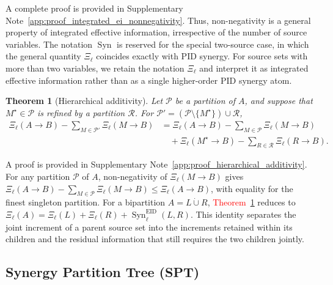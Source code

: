 \documentclass[fleqn,10pt]{wlscirep}
\newcommand{\rev}[1]{\textcolor{red}{#1}}
\theoremstyle{naturetheorem}
\newtheorem{theorem}{Theorem}
\begin{document}
A complete proof is provided in
Supplementary Note~\ref{app:proof_integrated_ei_nonnegativity}. Thus, non-negativity is a general property of integrated effective
information, irrespective of the number of source variables. The notation
\(\operatorname{Syn}\) is reserved for the special two-source case, in which
the general quantity \(\Xi_{\ell}\) coincides exactly with PID synergy.
For source sets with more than two variables, we retain the notation
\(\Xi_{\ell}\) and interpret it as integrated effective information rather
than as a single higher-order PID synergy atom.

\begin{theorem}[Hierarchical additivity]
\label{thm:hierarchical_additivity}
Let \(\mathcal{P}\) be a partition of \(A\), and suppose that
\(M^{\star}\in\mathcal{P}\) is refined by a partition \(\mathcal{R}\). For
\(\mathcal{P}'=(\mathcal{P}\setminus\{M^{\star}\})\cup\mathcal{R}\),
\begin{equation}
    \begin{aligned}
    \Xi_{\ell}(A\rightarrow B)-\sum_{M\in\mathcal{P}'}\Xi_{\ell}(M\rightarrow B)
    &=
    \Xi_{\ell}(A\rightarrow B)-\sum_{M\in\mathcal{P}}\Xi_{\ell}(M\rightarrow B)\\
    &\quad+\Xi_{\ell}(M^{\star}\rightarrow B)-\sum_{R\in\mathcal{R}}\Xi_{\ell}(R\rightarrow B).
    \end{aligned}    \label{eq:hierarchical_additivity}
\end{equation}
\end{theorem}

A proof is provided in Supplementary Note~\ref{app:proof_hierarchical_additivity}.
For any partition \(\mathcal{P}\) of \(A\), non-negativity of \(\Xi_{\ell}(M\rightarrow B)\) gives
\(\Xi_{\ell}(A\rightarrow B)-\sum_{M\in\mathcal{P}}\Xi_{\ell}(M\rightarrow B)\leq\Xi_{\ell}(A\rightarrow B)\),
with equality for the finest singleton partition. 
For a bipartition \(A=L\mathbin{\dot{\cup}}R\), %
\rev{Theorem~\ref{thm:hierarchical_additivity}} reduces to \(\Xi_{\ell}(A)=\Xi_{\ell}(L)+\Xi_{\ell}(R)+\operatorname{Syn}^{\mathrm{EID}}_{\ell}(L,R)\).
This identity separates the joint increment of a parent source set into the
increments retained within its children and the residual information that
still requires the two children jointly.

\subsection*{Synergy Partition Tree (SPT)}
\label{sec:methods_spt}
\end{document}

